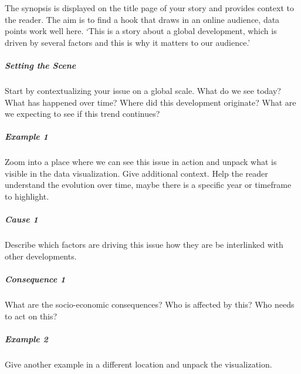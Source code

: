 \documentclass[
  12pt,
]{krantz}
\renewenvironment{quote}{\begin{VF}}{\end{VF}}
\begin{document}
\begin{quote}
The synopsis is displayed on the title page of your story and provides context to the reader. The aim is to find a hook that draws in an online audience, data points work well here. `This is a story about a global development, which is driven by several factors and this is why it matters to our audience.'
\end{quote}

\hypertarget{setting-the-scene}{%
\subparagraph*{Setting the Scene}\label{setting-the-scene}}

\begin{quote}
Start by contextualizing your issue on a global scale. What do we see today? What has happened over time? Where did this development originate? What are we expecting to see if this trend continues?
\end{quote}

\hypertarget{example-1}{%
\subparagraph*{Example 1}\label{example-1}}

\begin{quote}
Zoom into a place where we can see this issue in action and unpack what is visible in the data visualization. Give additional context. Help the reader understand the evolution over time, maybe there is a specific year or timeframe to highlight.
\end{quote}

\hypertarget{cause-1}{%
\subparagraph*{Cause 1}\label{cause-1}}

\begin{quote}
Describe which factors are driving this issue how they are be interlinked with other developments.
\end{quote}

\hypertarget{consequence-1}{%
\subparagraph*{Consequence 1}\label{consequence-1}}

\begin{quote}
What are the socio-economic consequences? Who is affected by this? Who needs to act on this?
\end{quote}

\hypertarget{example-2}{%
\subparagraph*{Example 2}\label{example-2}}

\begin{quote}
Give another example in a different location and unpack the visualization.
\end{quote}
\end{document}
